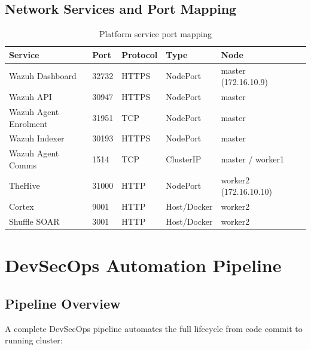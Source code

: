 \documentclass[12pt,a4paper]{report}
\begin{document}
\subsection{Network Services and Port Mapping}

\begin{table}[H]
\centering
\caption{Platform service port mapping}
\begin{tabular}{llllll}
\toprule
\textbf{Service} & \textbf{Port} & \textbf{Protocol} & \textbf{Type} & \textbf{Node} \\
\midrule
Wazuh Dashboard       & 32732 & HTTPS & NodePort    & master (172.16.10.9) \\
Wazuh API             & 30947 & HTTPS & NodePort    & master \\
Wazuh Agent Enrolment & 31951 & TCP   & NodePort    & master \\
Wazuh Indexer         & 30193 & HTTPS & NodePort    & master \\
Wazuh Agent Comms     & 1514  & TCP   & ClusterIP   & master / worker1 \\
TheHive               & 31000 & HTTP  & NodePort    & worker2 (172.16.10.10) \\
Cortex                & 9001  & HTTP  & Host/Docker & worker2 \\
Shuffle SOAR          & 3001  & HTTP  & Host/Docker & worker2 \\
\bottomrule
\end{tabular}
\label{tab:ports}
\end{table}

\section{DevSecOps Automation Pipeline}

\subsection{Pipeline Overview}

A complete DevSecOps pipeline automates the full lifecycle from code commit to running cluster:
\end{document}

